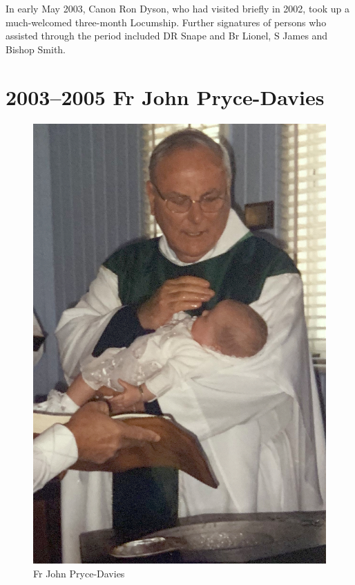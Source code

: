 In early May 2003, Canon Ron Dyson, who had visited briefly in 2002, took up a much-welcomed three-month Locumship. Further signatures of persons who assisted through the period included DR Snape and Br Lionel, S James and Bishop Smith.



\section{2003--2005 Fr John Pryce-Davies}









\begin{figure}
\begin{center}
\includegraphics[width=.8\linewidth,center]{../images/JohnPryceDaviesWessling.jpg}
\caption{Fr John Pryce-Davies}
\end{center}
\end{figure}




